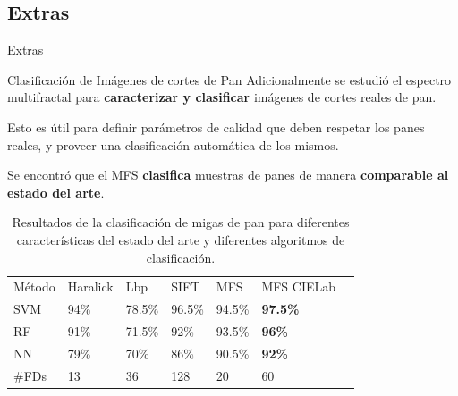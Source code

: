 \documentclass[spanish,unknownkeysallowed]{beamer}
\begin{document}
\subsection{Extras}

\begin{frame}
\begin{block}{}
\begin{center}
\vspace{1cm}
\huge{Extras}
\vspace{1cm}
\end{center}
\end{block}
\end{frame}

\begin{frame}{Clasificación de Imágenes de cortes de Pan}
Adicionalmente se estudió el espectro multifractal para \textbf{caracterizar y clasificar} imágenes de cortes reales de pan.

\vspace{0.3cm}

Esto es útil para definir parámetros de calidad que deben respetar los panes reales, y proveer una clasificación automática de los mismos.

\vspace{0.3cm}

Se encontró que el MFS \textbf{clasifica} muestras de panes de manera \textbf{comparable al estado del arte}.

\end{frame}

\begin{frame}
\begin{table}[h!]
\center
\begin{tabular}{lllllll}
\hline\noalign{\smallskip}
Método & Haralick & Lbp & SIFT & MFS & MFS CIELab\\ %
\noalign{\smallskip}\hline\noalign{\smallskip}
SVM & 94\% & 78.5\% & 96.5\% & 94.5\% & \textbf{97.5\%} \\
RF  & 91\% & 71.5\% & 92\% & 93.5\% & \textbf{96\%} \\
NN & 79\% & 70\% & 86\%  & 90.5\% & \textbf{92\%} \\
\noalign{\smallskip}\hline
\#FDs & 13 & 36 & 128 & 20 & 60\\
\hline
\end{tabular}
\caption{Resultados de la clasificación de migas de pan para diferentes características del estado del arte y diferentes algoritmos de clasificación.}
\label{tab:other} 
\end{table}
\end{frame}
\end{document}

